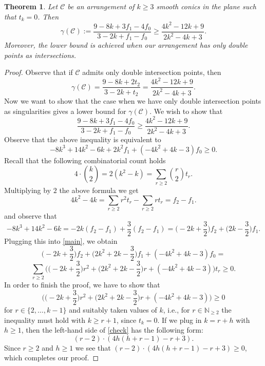 \documentclass[12pt]{amsart}
\theoremstyle{plain}
\newtheorem{theorem}[thm]{Theorem}
\theoremstyle{definition}
\renewcommand\geq{\geqslant}
\begin{document}
\begin{theorem}
Let $\mathcal{C}$ be an arrangement of $k\geq 3$ smooth conics in the plane such that $t_{k}=0$.
Then 
$$\gamma(\mathcal{C}) :=\frac{9-8k+3f_{1}-4f_{0}}{3-2k+f_{1}-f_{0}} \geq \frac{4k^2-12k+9}{2k^{2}-4k+3}.$$
Moreover, the lower bound is achieved when our arrangement has only double points as intersections.
\end{theorem}
\begin{proof}
Observe that if $\mathcal{C}$ admits only double intersection points, then
$$\gamma(\mathcal{C})= \frac{9-8k+2t_{2}}{3-2k+t_{2}} = \frac{4k^2-12k+9}{2k^{2}-4k+3}.$$
Now we want to show that the case when we have only double intersection points as singularities gives  a lower bound  for $\gamma(\mathcal{C})$. We wish  to show that
\begin{equation}
\frac{9-8k+3f_{1}-4f_{0}}{3-2k+f_{1}-f_{0}} \geq \frac{4k^2-12k+9}{2k^{2}-4k+3}.
\end{equation}
Observe that the above inequality is equivalent to
\begin{equation}
\label{main}
-8k^3+14k^2-6k + 2k^2f_{1}+(-4k^2+4k-3)f_{0} \geq 0.     
\end{equation}
Recall that the following combinatorial count holds
$$4\cdot \binom{k}{2} = 2(k^2-k) = \sum_{r\geq 2} \binom{r}{2}t_{r}.$$
Multiplying by $2$ the above formula we get
\begin{equation}
4k^2-4k  = \sum_{r \geq 2}r^{2}t_{r} - \sum_{r\geq 2} rt_{r}= f_{2} - f_{1}.
\end{equation}
and observe that
$$-8k^3+14k^2-6k = -2k(f_{2}-f_{1}) + \frac{3}{2}(f_{2}-f_{1}) = \bigg(-2k+\frac{3}{2}\bigg)f_{2} + \bigg(2k-\frac{3}{2}\bigg)f_{1}.$$
Plugging this into \eqref{main}, we obtain
$$\bigg(-2k + \frac{3}{2}\bigg)f_{2}+ \bigg(2k^2 + 2k-\frac{3}{2}\bigg)f_{1} +(-4k^2 + 4k - 3)f_{0} =$$
$$\sum_{r\geq 2}\bigg( \bigg(-2k+\frac{3}{2}\bigg)r^{2} + \bigg(2k^{2} + 2k - \frac{3}{2}\bigg)r + (-4k^{2} + 4k-3)\bigg)t_{r} \geq 0.$$
In order to finish the proof, we have to show that 
\begin{equation}
\label{check}
\bigg( \bigg(-2k+\frac{3}{2}\bigg)r^{2} + \bigg(2k^{2} + 2k - \frac{3}{2}\bigg)r + (-4k^{2} + 4k-3)\bigg) \geq 0
\end{equation}
for $r \in \{2, \ldots , k-1\}$ and suitably taken values of $k$, i.e., for $r \in \mathbb{N}_{\geq 2}$ the inequality must  hold with $k\geq r + 1$, since $t_{k}=0$. If we plug in $k = r + h$ with $h\geq 1$, then the left-hand side of \eqref{check} has the following form:
\begin{equation}
(r-2)\cdot(4h(h+r-1)-r+3).
\end{equation}
Since $r\geq 2$ and $h\geq 1$ we see that $(r-2)\cdot(4h(h+r-1)-r+3) \geq 0$, which completes our proof.
\end{proof}
\end{document}
